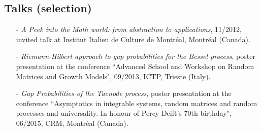 \documentclass[margin]{res}
\begin{document}
\begin{resume}
  \section{Talks (selection)}
 \begin{itemize} \itemsep -2pt  %
 \item[-] \emph{A Peek into the Math world: from abstraction to applications}, 11/2012, invited talk at Institut Italien de Culture de Montr\'eal, Montr\'eal (Canada).
 \item[-] \emph{Riemann-Hilbert approach to gap probabilities for the Bessel process}, poster presentation at the conference ``Advanced School and Workshop on Random Matrices and Growth Models", 09/2013, ICTP, Trieste (Italy).
 \item[-] \emph{Gap Probabilities of the Tacnode process}, poster presentation at the conference ``Asymptotics in integrable systems, random matrices and random processes and universality. In honour of Percy Deift's 70th birthday", 06/2015, CRM, Montr\'eal (Canada).

\end{itemize}
\end{resume}
\end{document}

